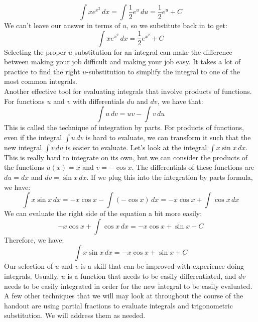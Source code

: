 \[
	\int xe^{x^2} \, dx = \int \frac{1}{2} e^u \, du = \frac{1}{2} e^u + C
\]
We can't leave our answer in terms of $u$, so we substitute back in to get: 
\[
	\int xe^{x^2} \, dx = \frac{1}{2}e^{x^2} + C
\]
Selecting the proper $u$-substitution for an integral can make the difference between making your job difficult and making your job easy. It takes a lot of practice to find the right $u$-substitution to simplify the integral to one of the most common integrals. \\
Another effective tool for evaluating integrals that involve products of functions. For functions $u$ and $v$ with differentials $du$ and $dv$, we have that:
\[
	\int u\, dv = uv - \int v \, du
\]
This is called the technique of integration by parts. For products of functions, even if the integral $\int u\, dv$ is hard to evaluate, we can transform it such that the new integral $\int v \, du$ is easier to evaluate. Let's look at the integral $\int x \sin x \, dx$. This is really hard to integrate on its own, but we can consider the products of the functions $u(x) = x$ and $v = -\cos x$. The differentials of these functions are $du = dx$ and $dv = \sin x \, dx$. If we plug this into the integration by parts formula, we have: 
\[
	\int x \sin x \, dx = -x \cos x - \int (- \cos x) \, dx = -x \cos x + \int \cos x \, dx
\]
We can evaluate the right side of the equation a bit more easily:
\[
	- x \cos x + \int \cos x \, dx = - x \cos x + \sin x + C
\]
Therefore, we have: 
\[
	\int x \sin x \, dx = -x \cos x + \sin x + C
\]
Our selection of $u$ and $v$ is a skill that can be improved with experience doing integrals. Usually, $u$ is a function that needs to be easily differentiated, and $dv$ needs to be easily integrated in order for the new integral to be easily evaluated. \\
A few other techniques that we will may look at throughout the course of the handout are using partial fractions to evaluate integrals and trigonometric substitution. We will address them as needed.

